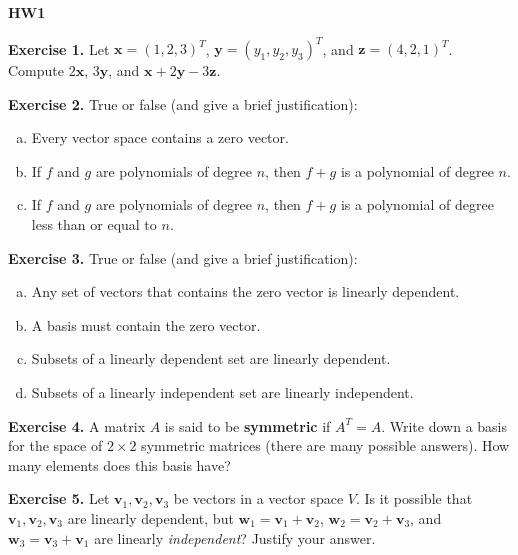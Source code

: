 \documentclass{article}
\begin{document}

\textbf{HW1}

\textbf{Exercise 1.} Let $\mathbf{x} = (1,2,3)^T$, $\mathbf{y} = (y_1, y_2, y_3)^T$, and $\mathbf{z} = (4,2,1)^T$. Compute $2\mathbf{x}$, $3\mathbf{y}$, and $\mathbf{x} + 2\mathbf{y} - 3\mathbf{z}$.


\textbf{Exercise 2.} True or false (and give a brief justification):
\begin{enumerate}[(a)]
    \item Every vector space contains a zero vector.
    \item If $f$ and $g$ are polynomials of degree $n$, then $f + g$ is a polynomial of degree $n$.
    \item If $f$ and $g$ are polynomials of degree $n$, then $f + g$ is a polynomial of degree less than or equal to $n$.
\end{enumerate}

\textbf{Exercise 3.} True or false (and give a brief justification):
\begin{enumerate}[(a)]
    \item Any set of vectors that contains the zero vector is linearly dependent.
    \item A basis must contain the zero vector.
    \item Subsets of a linearly dependent set are linearly dependent.
    \item Subsets of a linearly independent set are linearly independent.
\end{enumerate}

\textbf{Exercise 4.} A matrix $A$ is said to be \textbf{symmetric} if $A^T = A$. Write down a basis for the space of $2 \times 2$ symmetric matrices (there are many possible answers). How many elements does this basis have?

\textbf{Exercise 5.} Let $\mathbf{v}_1, \mathbf{v}_2, \mathbf{v}_3$ be vectors in a vector space $V$. Is it possible that $\mathbf{v}_1, \mathbf{v}_2, \mathbf{v}_3$ are linearly dependent, but 
$\mathbf{w}_1 = \mathbf{v}_1 + \mathbf{v}_2$, $\mathbf{w}_2 = \mathbf{v}_2 + \mathbf{v}_3$, and $\mathbf{w}_3 = \mathbf{v}_3 + \mathbf{v}_1$ are linearly \emph{independent}? Justify your answer.
\end{document}
